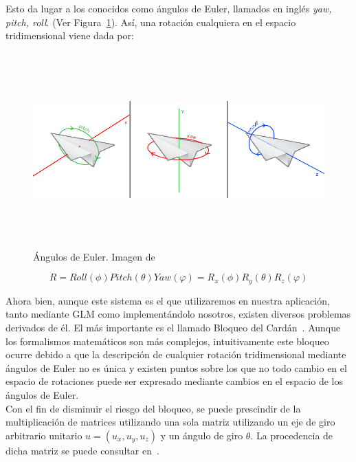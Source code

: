 Esto da lugar a los conocidos como ángulos de Euler, llamados en inglés
\textit{yaw, pitch, roll}. (Ver Figura~\ref{fig:eulerangles}). Así, una rotación
cualquiera en el espacio tridimensional viene dada por:

\begin{figure}
	\centering
	\includegraphics[height=7.5cm,width=\textwidth]{figures/eulerangles.png}
	\caption{Ángulos de Euler. Imagen de~\citet{LearnOpenGL}}
	\label{fig:eulerangles}
\end{figure}

\begin{equation}
		R = Roll(\phi)Pitch(\theta)Yaw(\varphi) = R_x(\phi)R_y(\theta)R_z(\varphi)	
\end{equation}

Ahora bien, aunque este sistema es el que utilizaremos en nuestra aplicación,
tanto mediante GLM como implementándolo nosotros, existen diversos problemas
derivados de él. El más importante es el llamado Bloqueo del
Cardán~\cite{Vince}. Aunque los formalismos matemáticos son más complejos,
intuitivamente este bloqueo ocurre debido a que la descripción de cualquier
rotación tridimensional mediante ángulos de Euler no es única y existen puntos
sobre los que no todo cambio en el espacio de rotaciones puede ser expresado
mediante cambios en el espacio de los ángulos de Euler. \\

Con el fin de disminuir el riesgo del bloqueo, se puede prescindir de la
multiplicación de matrices utilizando una sola matriz utilizando un eje de giro
arbitrario unitario $u = (u_x, u_y, u_z)$ y un ángulo de giro $\theta$. La
procedencia de dicha matriz se puede consultar en~\citet{rotationformula}. \\

